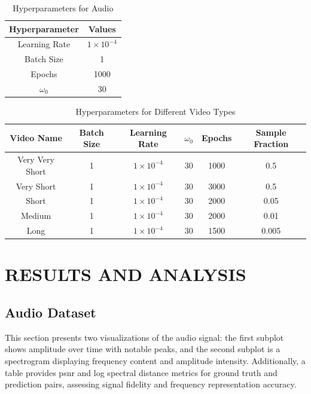 \documentclass{ioereport}
\begin{document}
\begin{table}[H]
    \caption{Hyperparameters for Audio}
    \centering
    \begin{tabular}{|c|c|}
    \hline
    \textbf{Hyperparameter} & \textbf{Values} \\
    \hline
    Learning Rate & \( 1 \times 10^{-4} \) \\
    \hline
    Batch Size & 1 \\
    \hline
    Epochs & 1000 \\
    \hline
    \( \omega_0 \) & 30 \\
    \hline
    \end{tabular}
    \label{tab:hyperparameters-audio}
\end{table}



\begin{table}[H]
    \caption{Hyperparameters for Different Video Types}
    \centering
    \begin{tabular}{|c|c|c|c|c|c|}
    \hline
    \textbf{Video Name} & \textbf{Batch Size} & \textbf{Learning Rate} & \textbf{\( \omega_0 \)} & \textbf{Epochs} & \textbf{Sample Fraction} \\
    \hline
    Very Very Short & 1 & \( 1 \times 10^{-4} \) & 30 & 1000 & 0.5 \\
    \hline
    Very Short & 1 & \( 1 \times 10^{-4} \) & 30 & 3000 & 0.5 \\
    \hline
    Short & 1 & \( 1 \times 10^{-4} \) & 30 & 2000 & 0.05 \\
    \hline
    Medium & 1 & \( 1 \times 10^{-4} \) & 30 & 2000 & 0.01 \\
    \hline
    Long & 1 & \( 1 \times 10^{-4} \) & 30 & 1500 & 0.005 \\
    \hline
    \end{tabular}
    \label{tab:hyperparameters-video}
\end{table}



\pagebreak 

\section{\MakeUppercase{Results and Analysis}}

    
    \subsection{Audio Dataset}
    This section presents two visualizations of the audio signal: the first subplot shows amplitude over time with notable peaks, and the second subplot is a spectrogram displaying frequency content and amplitude intensity. Additionally, a table provides \gls{psnr} and log spectral distance metrics for ground truth and prediction pairs, assessing signal fidelity and frequency representation accuracy.
    
\end{document}
